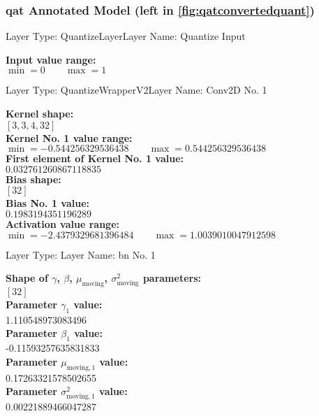 {\clearpage
\subsubsection*{\gls{qat} Annotated Model (left in \autoref{fig:qatconvertedquant})}

\begin{layerbox}{Layer Type: QuantizeLayer}{Layer Name: Quantize Input}
  \begin{center}
    \textbf{Input value range:} \\[2pt]
    $\min = 0 \quad\quad \max = 1$
  \end{center}
\end{layerbox}

\begin{layerbox}{Layer Type: QuantizeWrapperV2}{Layer Name: Conv2D No. 1}
  \begin{center}
    \textbf{Kernel shape:} \\[2pt]
    $[3, 3, 4, 32]$ \\[6pt]
    \textbf{Kernel No. 1 value range:} \\[2pt]
    $\min = -0.544256329536438 \quad\quad \max = 0.544256329536438$ \\[6pt]
    \textbf{First element of Kernel No. 1 value:} \\[2pt]
    $0.032761260867118835$ \\[6pt]
    \textbf{Bias shape:} \\[2pt]
    $[32]$ \\[6pt]
    \textbf{Bias No. 1 value:} \\[2pt]
    $0.1983194351196289$ \\[6pt]
    \textbf{Activation value range:} \\[2pt]
    $\min = -2.4379329681396484 \quad\quad \max = 1.0039010047912598$
  \end{center}
\end{layerbox}

\begin{layerbox}{Layer Type: }{Layer Name: \gls{bn} No. 1}
  \begin{center}
    \textbf{Shape of $\gamma$, $\beta$, $\mu_{\text{moving}}$, $\sigma^2_{\text{moving}}$ parameters:} \\[2pt]
    $[32]$ \\[6pt]
    \textbf{Parameter $\gamma_1$ value:} \\[2pt]
    1.110548973083496 \\[6pt]
    \textbf{Parameter $\beta_1$ value:} \\[2pt]
    -0.11593257635831833 \\[6pt]
    \textbf{Parameter $\mu_{\text{moving},1}$ value:} \\[2pt]
    0.17263321578502655 \\[6pt]
    \textbf{Parameter $\sigma^2_{\text{moving},1}$ value:} \\[2pt]
    0.00221889466047287
  \end{center}
\end{layerbox}


}
